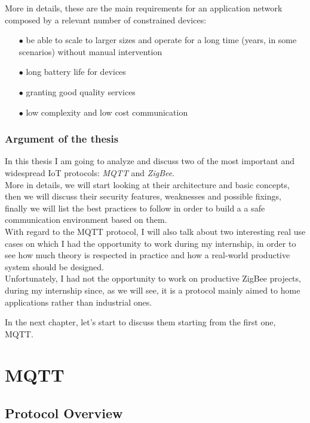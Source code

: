 \documentclass[12pt]{report}
\begin{document}
More in details, these are the main requirements for an application network composed by a relevant number of constrained devices:

\begin{itemize}
\setlength{\itemindent}{+4mm}
\item[$\bullet$] be able to scale to larger sizes and operate for a long time (years, in some scenarios) without manual intervention
\item[$\bullet$] long battery life for devices
\item[$\bullet$] granting good quality services
\item[$\bullet$] low complexity and low cost communication
\end{itemize}

\section{Argument of the thesis}
\bigskip
In this thesis I am going to analyze and discuss two of the most important and widespread IoT protocols: \emph{MQTT} and \emph{ZigBee}.\\
More in details, we will start looking at their architecture and basic concepts, then we will discuss their security features, weaknesses and possible fixings, finally we will list the best practices to follow in order to build a a safe communication environment based on them.\\

With regard to the MQTT protocol, I will also talk about two interesting real use cases on which I had the opportunity to work during my internship, in order to see how much theory is respected in practice and how a real-world productive system should be designed.\\

Unfortunately, I had not the opportunity to work on productive ZigBee projects, during my internship since, as we will see, it is a protocol mainly aimed to home applications rather than industrial ones.\\\newline


In the next chapter, let's start to discuss them starting from the first one, MQTT.

\part{MQTT}

\chapter{Protocol Overview}
\end{document}
